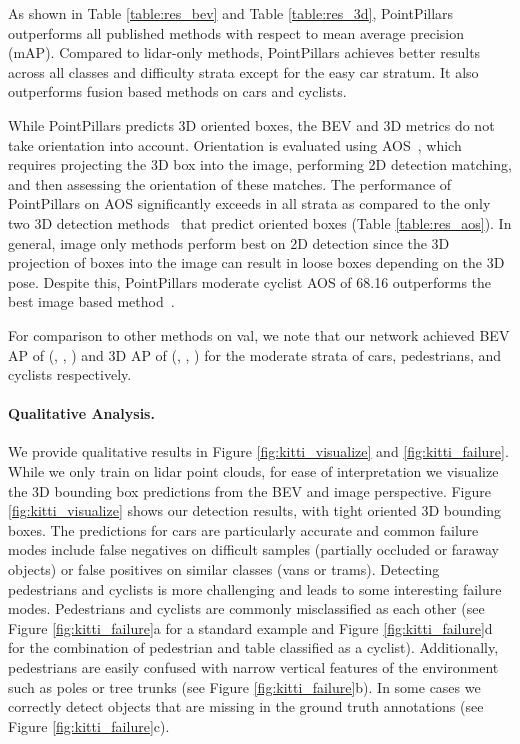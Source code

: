 \documentclass[10pt,twocolumn,letterpaper]{article}
\newcommand{\mypar}[1]{\vspace{-4mm}\paragraph{#1}}
\newcommand{\figref}[1]{Figure \ref{#1}}
\newcommand{\tableref}[1]{Table \ref{#1}}
\newcommand{\squeeze}{\vspace{-0.5mm}}
\begin{document}
As shown in \tableref{table:res_bev} and \tableref{table:res_3d}, PointPillars outperforms all published methods with respect to mean average precision (mAP).
Compared to lidar-only methods, PointPillars achieves better results across all classes and difficulty strata except for the easy car stratum.
It also outperforms fusion based methods on cars and cyclists.

While PointPillars predicts 3D oriented boxes, the BEV and 3D metrics do not take orientation into account.
Orientation is evaluated using AOS~\cite{kitti}, which requires projecting the 3D box into the image, performing 2D detection matching, and then assessing the orientation of these matches.
The performance of PointPillars on AOS significantly exceeds in all strata as compared to the only two 3D detection methods~\cite{avod,second} that predict oriented boxes (\tableref{table:res_aos}).
In general, image only methods perform best on 2D detection since the 3D projection of boxes into the image can result in loose boxes depending on the 3D pose.
Despite this, PointPillars moderate cyclist AOS of 68.16 outperforms the best image based method~\cite{xiang2017subcategory}.

For comparison to other methods on val, we note that our network achieved BEV AP of (, , ) and 3D AP of (, , ) for the moderate strata of cars, pedestrians, and cyclists respectively.

\squeeze
\mypar{Qualitative Analysis.}
We provide qualitative results in \figref{fig:kitti_visualize} and \ref{fig:kitti_failure}.
While we only train on lidar point clouds, for ease of interpretation we visualize the 3D bounding box predictions from the BEV and image perspective.
\figref{fig:kitti_visualize} shows our detection results, with tight oriented 3D bounding boxes.
The predictions for cars are particularly accurate and common failure modes include false negatives on difficult samples (partially occluded or faraway objects) or false positives on similar classes (vans or trams).
Detecting pedestrians and cyclists is more challenging and leads to some interesting failure modes.
Pedestrians and cyclists are commonly misclassified as each other (see \figref{fig:kitti_failure}a for a standard example and \figref{fig:kitti_failure}d for the combination of pedestrian and table classified as a cyclist).
Additionally, pedestrians are easily confused with narrow vertical features of the environment such as poles or tree trunks (see \figref{fig:kitti_failure}b).
In some cases we correctly detect objects that are missing in the ground truth annotations (see \figref{fig:kitti_failure}c).
\end{document}
